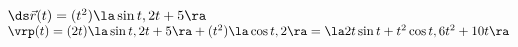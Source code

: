 {$\ds \vec r(t) = (t^2)\la \sin t, 2t+5\ra$
}
{
$\vrp(t) = (2t)\la \sin t,2t+5\ra + (t^2) \la \cos t, 2\ra = \la2t\sin t + t^2\cos t, 6t^2+10t\ra$
}


